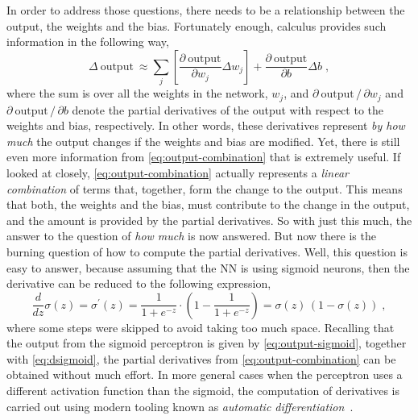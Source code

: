 In order to address those questions, there needs to be a relationship between the output, the weights and the bias. Fortunately enough, calculus provides such information in the 
following way,
\begin{equation}
    \Delta \ \text{output} \ \approx \sum_{j} \left[ \frac{\partial \ \text{output}}{\partial w_j} \Delta w_j \right] + \frac{\partial \ \text{output}}{\partial b} \Delta b
    \; ,
    \label{eq:output-combination}
\end{equation}
where the sum is over all the weights in the network, \(w_j\), and \(\partial \ \text{output} \, / \, \partial w_j\) and \(\partial \ \text{output} \, / \, \partial b\) denote 
the partial derivatives of the output with respect to the weights and bias, respectively. 
In other words, these derivatives represent \emph{by how much} the output changes if the 
weights and bias are modified. Yet, there is still even more information from \autoref{eq:output-combination} 
that is extremely useful. If looked at closely, \autoref{eq:output-combination} actually 
represents a \emph{linear combination} of terms that, together, form the change to the 
output. This means that both, the weights and the bias, must contribute to the change in 
the output, and the amount is provided by the partial derivatives. So with just this much, 
the answer to the question of \emph{how much} is now answered. But now there is the burning 
question of how to compute the partial derivatives. Well, this question is easy to answer, 
because assuming that the NN is using sigmoid neurons, then the derivative can be reduced 
to the following expression,
\begin{equation}
    \frac{d}{dz} \sigma (z) = \sigma^{\prime} (z) = \frac{1}{1 + e^{-z}}  \cdot \left(1 - \frac{1}{1 + e^{-z}}\right) = \sigma (z) \, \left(1 - \sigma (z)\right)
    \; ,
    \label{eq:dsigmoid}
\end{equation}
where some steps were skipped to avoid taking too much space. Recalling that the output from 
the sigmoid perceptron is given by \autoref{eq:output-sigmoid}, together with \autoref{eq:dsigmoid}, 
the partial derivatives from \autoref{eq:output-combination} can be obtained without much
effort. In more general cases when the perceptron uses a different activation function than 
the sigmoid, the computation of derivatives is carried out using modern tooling known as 
\emph{automatic differentiation}~\cite{baydinAutomaticDifferentiationMachine2018}.

